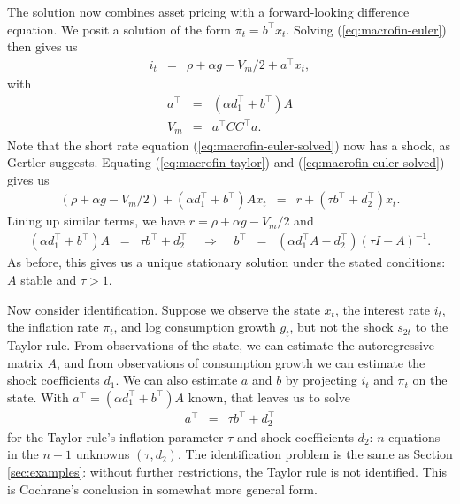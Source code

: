 \documentclass[12pt]{article}
\newcounter{tab}
\begin{document}
{The solution now combines asset pricing with a forward-looking difference equation.
We posit a solution of the form $\pi_t = b^\top x_t$.
Solving (\ref{eq:macrofin-euler}) then gives us
\begin{eqnarray}
    i_t   &=&  \rho+\alpha g - V_m/2  + a^\top x_t ,
    \label{eq:macrofin-euler-solved}
\end{eqnarray}
with
\begin{eqnarray*}
    a^\top &=& (\alpha d_1^\top + b^\top)  A  \\
    V_m     &=& a^\top C C^\top a .
\end{eqnarray*}
Note that the short rate equation (\ref{eq:macrofin-euler-solved}) now has a shock,
as Gertler suggests.
Equating (\ref{eq:macrofin-taylor}) and (\ref{eq:macrofin-euler-solved}) gives us
\begin{eqnarray*}
    \left(\rho+\alpha g - V_m/2\right)
    + (\alpha d_1^\top + b^\top)  A  x_t
    &=&
    r + (\tau b^\top + d_2^\top ) x_t.
\end{eqnarray*}
Lining up similar terms, we have
$   r   = \rho + \alpha g - V_m/ 2 $ and
\begin{eqnarray*}
    (\alpha d_1^\top + b^\top)  A
        \;\;=\;\;  \tau b^\top + d_2^\top
        \;\;\;\;\Rightarrow \;\;\;\;
        b^\top \;\;=\;\; (\alpha d_1^\top A - d_2^\top) (\tau I -  A )^{-1} .
\end{eqnarray*}
As before, this gives us a unique stationary solution
under the stated conditions:  $ A $ stable and $\tau>1$.


Now consider identification.
Suppose we observe the state $x_t$, the interest rate $i_t$,
the inflation rate $\pi_t$, and log consumption growth $g_t$,
but not the shock $s_{2t}$ to the Taylor rule.
From observations of the state,
we can estimate the autoregressive matrix $ A $,
and from observations of consumption growth we can estimate
the shock coefficients $d_1$.
We can also estimate $a$ and $b$ by projecting
$i_t$ and $\pi_t$ on the state.
With $a^\top = (\alpha d_1^\top + b^\top)  A $ known, that leaves us to solve
\begin{eqnarray}
    a^\top
        &=&  \tau b^\top + d_2^\top
        \label{eq:macrofin-solution-2}
\end{eqnarray}
for the Taylor rule's inflation parameter $\tau$  and shock coefficients $d_2$:
$n$ equations in the $n+1$ unknowns $(\tau,d_2)$.
The identification problem is the same as Section \ref{sec:examples}:
without further restrictions,
the Taylor rule is not identified.
This is Cochrane's conclusion in somewhat more general form.

}
\end{document}
